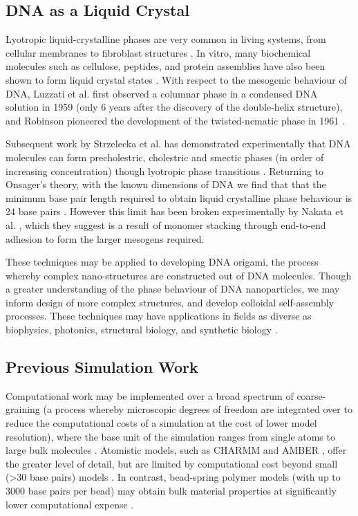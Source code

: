 \documentclass[11pt, a4paper]{article} %
\begin{document}
\subsection{DNA as a Liquid Crystal} 
Lyotropic liquid-crystalline phases are very common in living systems, from cellular membranes to fibroblast structures \cite{Stewart1966, Rey2013}. In vitro, many biochemical molecules such as cellulose, peptides, and protein assemblies have also been shown to form liquid crystal states \cite{Zhao2019}. With respect to the mesogenic behaviour of DNA, Luzzati et al. first observed a columnar phase in a condensed DNA solution in 1959 (only 6 years after the discovery of the double-helix structure), and Robinson pioneered the development of the twisted-nematic phase in 1961 \cite{Luzzati1959, Robinson1961}. 

Subsequent work by Strzelecka et al. has demonstrated experimentally that DNA molecules can form precholestric, cholestric and smectic phases (in order of increasing concentration) though lyotropic phase transitions \cite{Strzelecka1988}. 
Returning to Onsager's theory, with the known dimensions of DNA we find that that the minimum base pair length required to obtain liquid crystalline phase behaviour is 24 base pairs \cite{Bolhuis1997}. However this limit has been broken experimentally by Nakata et al. \cite{Nakata2007, Zanchetta2008}, which they suggest is a result of monomer stacking through end-to-end adhesion to form the larger mesogens required.

These techniques may be applied to developing DNA origami, the process whereby complex nano-structures are constructed out of DNA molecules. Though a greater understanding of the phase behaviour of DNA nanoparticles, we may inform design of more complex structures, and develop colloidal self-assembly processes. These techniques may have applications in fields as diverse as biophysics, photonics, structural biology, and synthetic biology \cite{Nummelin2018, Praetorius2017, Bathe2017}.

\subsection{Previous Simulation Work} \label{PrevWork}
Computational work may be implemented over a broad spectrum of coarse-graining (a process whereby microscopic degrees of freedom are integrated over to reduce the computational costs of a simulation at the cost of lower model resolution), where the base unit of the simulation ranges from single atoms to large bulk molecules \cite{Inglfsson2013, Potoyan2012}. Atomistic models, such as CHARMM \cite{MacKerell1995} and AMBER \cite{SalomonFerrer2012}, offer the greater level of detail, but are limited by computational cost beyond small (>30 base pairs) models \cite{Cheatham2004}. In contrast, bead-spring polymer models (with up to 3000 base pairs per bead) may obtain bulk material properties at significantly lower computational expense \cite{Michieletto2016}.
\end{document}
